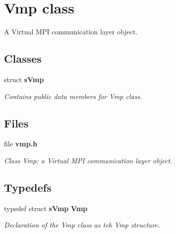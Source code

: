 \section{Vmp class}
\label{a00025}


A Virtual MPI communication layer object.  


\subsection*{Classes}
\begin{DoxyCompactItemize}
\item 
struct {\bf sVmp}
\begin{DoxyCompactList}\small\item\em Contains public data members for Vmp class. \item\end{DoxyCompactList}\end{DoxyCompactItemize}
\subsection*{Files}
\begin{DoxyCompactItemize}
\item 
file {\bf vmp.h}


\begin{DoxyCompactList}\small\item\em Class Vmp: a Virtual MPI communication layer object. \item\end{DoxyCompactList}

\end{DoxyCompactItemize}
\subsection*{Typedefs}
\begin{DoxyCompactItemize}
\item 
typedef struct {\bf sVmp} {\bf Vmp}
\begin{DoxyCompactList}\small\item\em Declaration of the Vmp class as teh Vmp structure. \item\end{DoxyCompactList}\end{DoxyCompactItemize}
